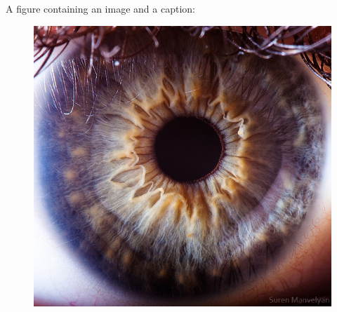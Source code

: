 A figure containing an image and a caption:
\begin{figure}[H]
	\includegraphics[width=0.8\linewidth]{eye.png}
	\label{fig:human-eye}
\end{figure}
